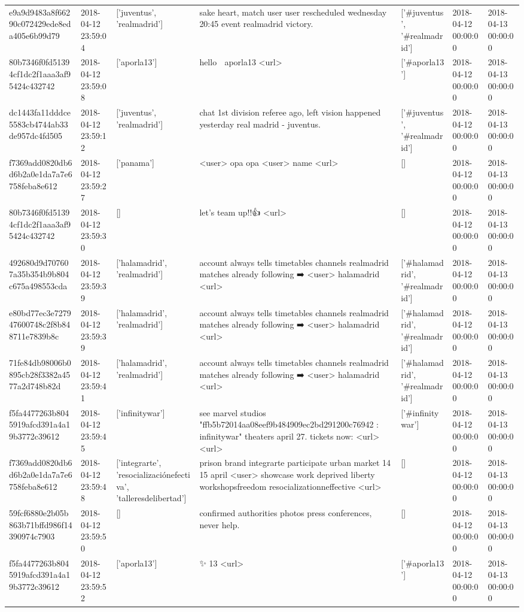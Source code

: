 \begin{tabular}{lllllll}
e9a9d9483a8f66290c072429ede8eda405e6b99d79 & 2018-04-12 23:59:04 & ['juventus', 'realmadrid'] & sake heart, match user user rescheduled wednesday 20:45 event realmadrid victory. & ['#juventus', '#realmadrid'] & 2018-04-12 00:00:00 & 2018-04-13 00:00:00 \\
80b7346f0fd51394cf1dc2f1aaa3af95424c432742 & 2018-04-12 23:59:08 & ['aporla13'] & hello 💪 aporla13 <url> & ['#aporla13'] & 2018-04-12 00:00:00 & 2018-04-13 00:00:00 \\
dc1443fa11dddce5583cb4744ab33de957dc4fd505 & 2018-04-12 23:59:12 & ['juventus', 'realmadrid'] & chat 1st division referee ago, left vision happened yesterday real madrid - juventus. & ['#juventus', '#realmadrid'] & 2018-04-12 00:00:00 & 2018-04-13 00:00:00 \\
f7369add0820db6d6b2a0e1da7a7e6758feba8e612 & 2018-04-12 23:59:27 & ['panama'] & <user> opa opa <user> name <url> & [] & 2018-04-12 00:00:00 & 2018-04-13 00:00:00 \\
80b7346f0fd51394cf1dc2f1aaa3af95424c432742 & 2018-04-12 23:59:30 & [] & let's team up!!👍 <url> & [] & 2018-04-12 00:00:00 & 2018-04-13 00:00:00 \\
492680d9d707607a35b354b9b804c675a498553cda & 2018-04-12 23:59:39 & ['halamadrid', 'realmadrid'] & account always tells timetables channels realmadrid matches already following ➡️ <user> halamadrid <url> & ['#halamadrid', '#realmadrid'] & 2018-04-12 00:00:00 & 2018-04-13 00:00:00 \\
e80bd77ec3e727947600748c2f8b848711e7839b8c & 2018-04-12 23:59:39 & ['halamadrid', 'realmadrid'] & account always tells timetables channels realmadrid matches already following ➡️ <user> halamadrid <url> & ['#halamadrid', '#realmadrid'] & 2018-04-12 00:00:00 & 2018-04-13 00:00:00 \\
71fe84db98006b0895cb28f3382a4577a2d748b82d & 2018-04-12 23:59:41 & ['halamadrid', 'realmadrid'] & account always tells timetables channels realmadrid matches already following ➡️ <user> halamadrid <url> & ['#halamadrid', '#realmadrid'] & 2018-04-12 00:00:00 & 2018-04-13 00:00:00 \\
f5fa4477263b8045919afcd391a4a19b3772c39612 & 2018-04-12 23:59:45 & ['infinitywar'] & see marvel studios "ffb5b72014aa08eef9b484909ec2bd291200c76942 : infinitywar" theaters april 27. tickets now: <url> <url> & ['#infinitywar'] & 2018-04-12 00:00:00 & 2018-04-13 00:00:00 \\
f7369add0820db6d6b2a0e1da7a7e6758feba8e612 & 2018-04-12 23:59:48 & ['integrarte', 'resocializaciónefectiva', 'talleresdelibertad'] & prison brand integrarte participate urban market 14 15 april <user> showcase work deprived liberty workshopsfreedom resocializationneffective <url> & [] & 2018-04-12 00:00:00 & 2018-04-13 00:00:00 \\
59fcf6880e2b05b863b71bffd986f14390974c7903 & 2018-04-12 23:59:50 & [] & confirmed authorities photos press conferences, never help. & [] & 2018-04-12 00:00:00 & 2018-04-13 00:00:00 \\
f5fa4477263b8045919afcd391a4a19b3772c39612 & 2018-04-12 23:59:52 & ['aporla13'] & ✨ 13 <url> & ['#aporla13'] & 2018-04-12 00:00:00 & 2018-04-13 00:00:00 \\
\bottomrule
\end{tabular}
